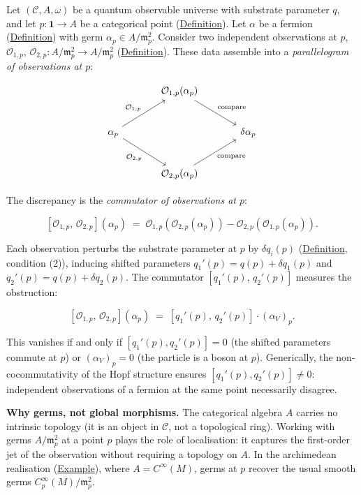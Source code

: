 \begin{remark}
  \label{rem:two-observer-parallelogram}
Let $(\mathcal{C}, A, \omega)$ be a quantum observable universe with
substrate parameter $q$, and let
$p \colon \mathbf{1} \to A$ be a categorical point
(\hyperref[def:categorical-point]{Definition}).  Let
$\alpha$ be a fermion (\hyperref[def:fermion]{Definition}) with germ
$\alpha_p \in A / \mathfrak{m}_p^2$.
Consider two independent observations at $p$,
$\mathcal{O}_{1,p},\, \mathcal{O}_{2,p} \colon
A / \mathfrak{m}_p^2 \to A / \mathfrak{m}_p^2$
(\hyperref[def:observation]{Definition}).  These data
assemble into a \emph{parallelogram of observations at $p$}:

\begin{equation}\label{eq:observation-parallelogram}
\begin{tikzcd}[row sep=2.5em, column sep=3.5em]
  & \mathcal{O}_{1,p}(\alpha_p) \arrow[dr, "\text{compare}"] & \\
  \alpha_p \arrow[ur, "\mathcal{O}_{1,p}"]
           \arrow[dr, "\mathcal{O}_{2,p}"']
  & & \delta\alpha_p \\
  & \mathcal{O}_{2,p}(\alpha_p) \arrow[ur, "\text{compare}"'] &
\end{tikzcd}
\end{equation}

The discrepancy is the \emph{commutator of observations at $p$}:

\[
[\mathcal{O}_{1,p},\, \mathcal{O}_{2,p}](\alpha_p)
  \;=\;
  \mathcal{O}_{1,p}(\mathcal{O}_{2,p}(\alpha_p))
  - \mathcal{O}_{2,p}(\mathcal{O}_{1,p}(\alpha_p)).
\]

Each observation perturbs the substrate parameter at $p$ by
$\delta q_i(p)$ (\hyperref[def:observation]{Definition}, condition (2)),
inducing shifted parameters $q_1'(p) = q(p) + \delta q_1(p)$
and $q_2'(p) = q(p) + \delta q_2(p)$.  The commutator
$[q_1'(p),\, q_2'(p)]$ measures the obstruction:

\[
[\mathcal{O}_{1,p},\, \mathcal{O}_{2,p}](\alpha_p)
  \;=\;
  [q_1'(p),\, q_2'(p)] \cdot (\alpha_V)_p.
\]

This vanishes if and only if $[q_1'(p), q_2'(p)] = 0$ (the shifted
parameters commute at $p$) or $(\alpha_V)_p = 0$ (the particle is a
boson at $p$).  Generically, the non-cocommutativity of the Hopf
structure ensures $[q_1'(p), q_2'(p)] \neq 0$: independent
observations of a fermion at the same point necessarily disagree.

\textbf{Why germs, not global morphisms.}
The categorical algebra $A$ carries no intrinsic topology (it is an
object in $\mathcal{C}$, not a topological ring).  Working with germs
$A / \mathfrak{m}_p^2$ at a point $p$ plays the role of localisation:
it captures the first-order jet of the observation without requiring a
topology on $A$.  In the archimedean realisation
(\hyperref[def:c-quantum-observable-universe]{Example}), where
$A = C^{\infty}(M)$, germs at $p$ recover the usual smooth germs
$C^{\infty}_p(M) / \mathfrak{m}_p^2$.
\end{remark}

